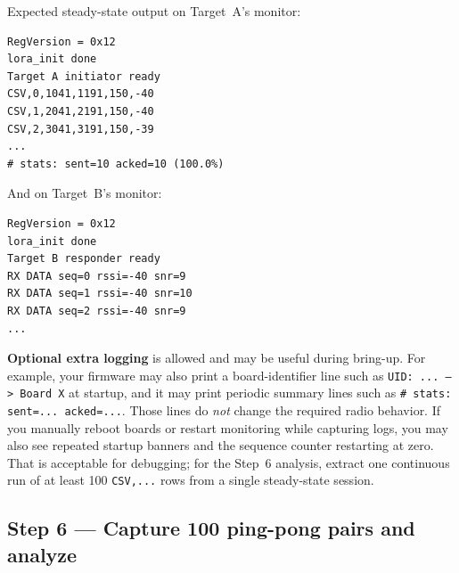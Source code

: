 \documentclass[11pt,letterpaper]{article}
\begin{document}
Expected steady-state output on Target~A's monitor:
\begin{verbatim}
RegVersion = 0x12
lora_init done
Target A initiator ready
CSV,0,1041,1191,150,-40
CSV,1,2041,2191,150,-40
CSV,2,3041,3191,150,-39
...
# stats: sent=10 acked=10 (100.0%)
\end{verbatim}
And on Target~B's monitor:
\begin{verbatim}
RegVersion = 0x12
lora_init done
Target B responder ready
RX DATA seq=0 rssi=-40 snr=9
RX DATA seq=1 rssi=-40 snr=10
RX DATA seq=2 rssi=-40 snr=9
...
\end{verbatim}

\newpage
\begin{tcolorbox}[infobox={Optional diagnostic logging is acceptable}]
\textbf{Optional extra logging} is allowed and may be useful during bring-up. For example, your firmware may also print a board-identifier line such as \texttt{UID: ... --> Board X} at startup, and it may print periodic summary lines such as \texttt{\# stats: sent=... acked=...}. Those lines do \emph{not} change the required radio behavior. If you manually reboot boards or restart monitoring while capturing logs, you may also see repeated startup banners and the sequence counter restarting at zero. That is acceptable for debugging; for the Step~6 analysis, extract one continuous run of at least 100 \texttt{CSV,...} rows from a single steady-state session.
\end{tcolorbox}



\newpage
\subsection{Step 6 --- Capture 100 ping-pong pairs and analyze}
\end{document}
